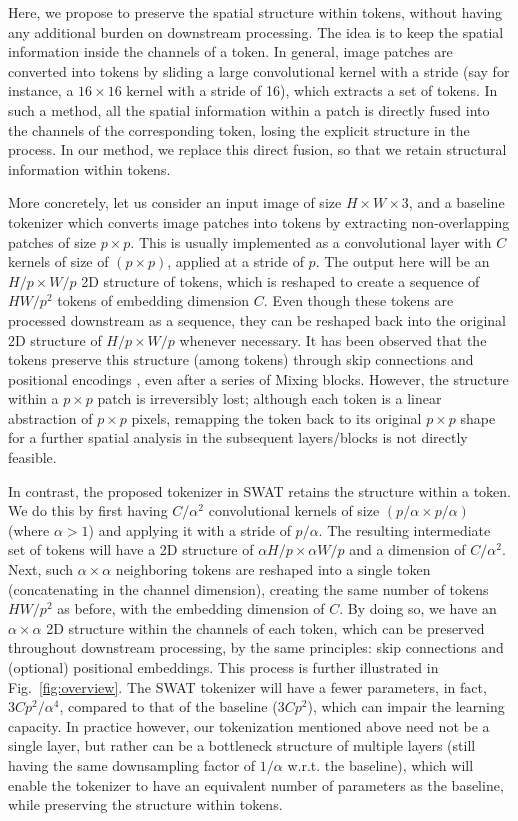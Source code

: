 \documentclass[10pt,twocolumn,letterpaper]{article}
\newcommand{\fref}[1]{Fig.~\ref{#1}}
\begin{document}
Here, we propose to preserve the spatial structure within tokens, without having any additional burden on downstream processing. The idea is to keep the spatial information inside the channels of a token. In general, image patches are converted into tokens by sliding a large convolutional kernel with a stride (say for instance, a $16\times16$ kernel with a stride of 16), which extracts a set of tokens. In such a method, all the spatial information within a patch is directly fused into the channels of the corresponding token, losing the explicit structure in the process. In our method, we replace this direct fusion, so that we retain structural information within tokens.

More concretely, let us consider an input image of size $H\times W\times 3$, and a baseline tokenizer which converts image patches into tokens by extracting non-overlapping patches of size $p\times p$. This is usually implemented as a convolutional layer with $C$ kernels of size of $(p\times p)$, applied at a stride of $p$. The output here will be an $H/p\times W/p$ 2D structure of tokens, which is reshaped to create a sequence of $HW/p^2$ tokens of embedding dimension $C$. Even though these tokens are processed downstream as a sequence, they can be reshaped back into the original 2D structure of $H/p\times W/p$ whenever necessary. It has been observed that the tokens preserve this structure (among tokens) through skip connections and positional encodings \cite{caron2021emerging, naseer2021intriguing}, 
even after a series of Mixing blocks. However, the structure within a $p\times p$ patch is irreversibly lost; although each token is a linear abstraction of $p\times p$ pixels, remapping the token back to its original $p\times p$ shape for a further spatial analysis in the subsequent layers/blocks is not directly feasible.

In contrast, the proposed tokenizer in SWAT retains the structure within a token. We do this by first having $C/\alpha^2$ convolutional kernels of size $(p/\alpha\times p/\alpha)$ (where $\alpha>1$) and applying it with a stride of $p/\alpha$. The resulting intermediate set of tokens will have a 2D structure of $\alpha H/p\times \alpha W/p$ and a dimension of $C/\alpha^2$. Next, such  $\alpha\times\alpha$ neighboring tokens are reshaped into a single token (concatenating in the channel dimension), creating the same number of tokens $HW/p^2$ as before, with the embedding dimension of $C$. By doing so, we have an $\alpha\times\alpha$ 2D structure within the channels of each token, which can be preserved throughout downstream processing, by the same principles: skip connections and (optional) positional embeddings. This process is further illustrated in \fref{fig:overview}. The SWAT tokenizer will have a fewer parameters, in fact,  $3Cp^2/\alpha^4$, compared to that of the baseline ($3Cp^2$), which can impair the learning capacity. In practice however, our tokenization mentioned above need not be a single layer, but rather can be a bottleneck structure of multiple layers (still having the same downsampling factor of $1/\alpha$ w.r.t. the baseline), which will enable the tokenizer to have an equivalent number of parameters as the baseline, while preserving the structure within tokens.
\end{document}
